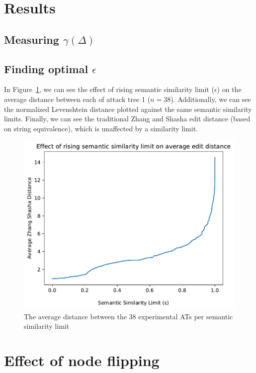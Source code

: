 \section{Results}
\label{sec:results}



\subsection{Measuring $\gamma(\Delta)$}



\subsection{Finding optimal $\epsilon$}

In Figure~\ref{img:similaritylimits}, we can see the effect of rising semantic similarity limit ($\epsilon$) on the average distance between each of attack tree 1 ($n=38$). Additionally, we can see the normalized Levenshtein distance plotted against the same semantic similarity limits. Finally, we can see the traditional Zhang and Shasha edit distance (based on string equivalence), which is unaffected by a similarity limit.

\begin{figure}
    \includegraphics[width=\linewidth]{code/img/similaritylimits.pdf}
\caption{The average distance between the 38 experimental ATs per semantic similarity limit}
\label{img:similaritylimits}
\end{figure}



\section{Effect of node flipping}


